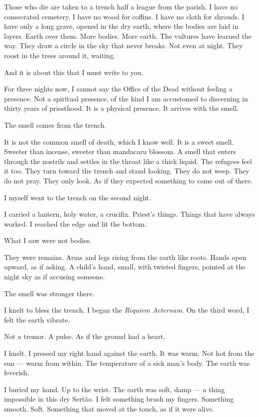 \noindent Those who die are taken to a trench half a league from the parish. I have no consecrated cemetery. I have no wood for coffins. I have no cloth for shrouds. I have only a long grave, opened in the dry earth, where the bodies are laid in layers. Earth over them. More bodies. More earth. The vultures have learned the way. They draw a circle in the sky that never breaks. Not even at night. They roost in the trees around it, waiting.

\noindent And it is about this that I must write to you.

\noindent For three nights now, I cannot say the Office of the Dead without feeling a presence. Not a spiritual presence, of the kind I am accustomed to discerning in thirty years of priesthood. It is a physical presence. It arrives with the smell.

\noindent The smell comes from the trench.

\noindent It is not the common smell of death, which I know well. It is a sweet smell. Sweeter than incense, sweeter than mandacaru blossom. A smell that enters through the nostrils and settles in the throat like a thick liquid. The refugees feel it too. They turn toward the trench and stand looking. They do not weep. They do not pray. They only look. As if they expected something to come out of there.

\noindent I myself went to the trench on the second night.

\noindent I carried a lantern, holy water, a crucifix. Priest's things. Things that have always worked. I reached the edge and lit the bottom.

\noindent What I saw were not bodies.

\noindent They were remains. Arms and legs rising from the earth like roots. Hands open upward, as if asking. A child's hand, small, with twisted fingers, pointed at the night sky as if accusing someone.

\noindent The smell was stronger there.

\noindent I knelt to bless the trench. I began the \textit{Requiem Aeternam}. On the third word, I felt the earth vibrate.

\noindent Not a tremor. A pulse. As if the ground had a heart.

\noindent I knelt. I pressed my right hand against the earth. It was warm. Not hot from the sun --- warm from within. The temperature of a sick man's body. The earth was feverish.

\noindent I buried my hand. Up to the wrist. The earth was soft, damp --- a thing impossible in this dry Sertão. I felt something brush my fingers. Something smooth. Soft. Something that moved at the touch, as if it were alive.

